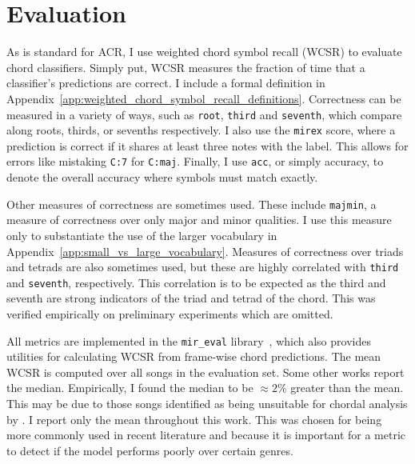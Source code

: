 

\section{Evaluation}\label{sec:evaluation}

As is standard for ACR, I use weighted chord symbol recall (WCSR) to evaluate chord classifiers. Simply put, WCSR measures the fraction of time that a classifier's predictions are correct. I include a formal definition in Appendix~\ref{app:weighted_chord_symbol_recall_definitions}. Correctness can be measured in a variety of ways, such as \texttt{root}, \texttt{third} and \texttt{seventh}, which compare along roots, thirds, or sevenths respectively. I also use the \texttt{mirex} score, where a prediction is correct if it shares at least three notes with the label. This allows for errors like mistaking \texttt{C:7} for \texttt{C:maj}. Finally, I use \texttt{acc}, or simply accuracy, to denote the overall accuracy where symbols must match exactly.

Other measures of correctness are sometimes used. These include \texttt{majmin}, a measure of correctness over only major and minor qualities. I use this measure only to substantiate the use of the larger vocabulary in Appendix~\ref{app:small_vs_large_vocabulary}. Measures of correctness over triads and tetrads are also sometimes used, but these are highly correlated with \texttt{third} and \texttt{seventh}, respectively. This correlation is to be expected as the third and seventh are strong indicators of the triad and tetrad of the chord. This was verified empirically on preliminary experiments which are omitted.

All metrics are implemented in the \texttt{mir\_eval} library~\citep{mir_eval}, which also provides utilities for calculating WCSR from frame-wise chord predictions. The mean WCSR is computed over all songs in the evaluation set. Some other works report the median. Empirically, I found the median to be $\approx 2\%$ greater than the mean. This may be due to those songs identified as being unsuitable for chordal analysis by \citet{FourTimelyInsights}. I report only the mean throughout this work. This was chosen for being more commonly used in recent literature and because it is important for a metric to detect if the model performs poorly over certain genres.

